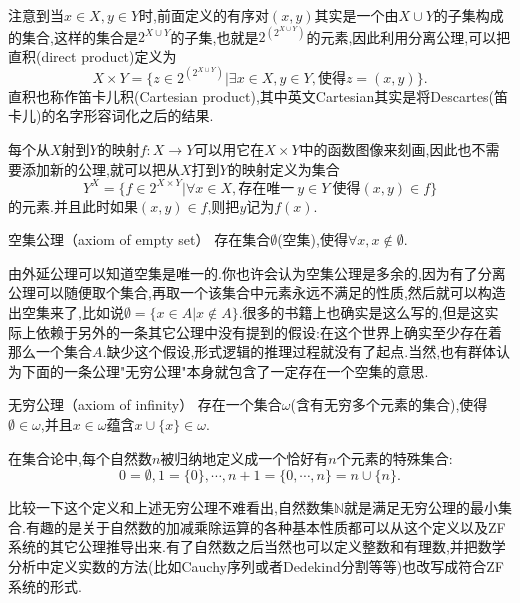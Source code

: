 \begin{frame}
注意到当$x\in X,y\in Y$时,前面定义的有序对$(x,y)$其实是一个由$X\cup Y$的子集构成的集合,这样的集合是$2^{X\cup Y}$的子集,也就是$2^{(2^{X\cup Y})}$的元素,因此利用分离公理,可以把直积(direct product)定义为
\begin{equation}
X\times Y = \{ z\in 2^{(2^{X\cup Y})}| \exists x\in X,y\in Y,\text{使得}z=(x,y) \}.
\end{equation}
直积也称作笛卡儿积(Cartesian product),其中英文Cartesian其实是将Descartes(笛卡儿)的名字形容词化之后的结果.

每个从$X$射到$Y$的映射$f:X\rightarrow Y$可以用它在$X\times Y$中的函数图像来刻画,因此也不需要添加新的公理,就可以把从$X$打到$Y$的映射定义为集合
\begin{equation}
Y^X = \{f\in 2^{X\times Y} | \forall x\in X,\text{存在唯一}\ y\in Y\ \text{使得}(x,y)\in f \}
\end{equation}
的元素.并且此时如果$(x,y)\in f$,则把$y$记为$f(x)$.
\end{frame}

\begin{frame}
\alert{空集公理}（axiom of empty set） 存在集合$\emptyset$(空集),使得$\forall x,x\notin \emptyset$.

由外延公理可以知道空集是唯一的.你也许会认为空集公理是多余的,因为有了分离公理可以随便取个集合,再取一个该集合中元素永远不满足的性质,然后就可以构造出空集来了,比如说$\emptyset=\{x\in A|x\notin A\}$.很多的书籍上也确实是这么写的,但是这实际上依赖于另外的一条其它公理中没有提到的假设:在这个世界上确实至少存在着那么一个集合$A$.缺少这个假设,形式逻辑的推理过程就没有了起点.当然,也有群体认为下面的一条公理"无穷公理"本身就包含了一定存在一个空集的意思.
\end{frame}

\begin{frame}
\alert{无穷公理}（axiom of infinity） 存在一个集合$\omega$(含有无穷多个元素的集合),使得$\emptyset\in\omega$,并且$x\in\omega$蕴含$x\cup\{x\}\in\omega$.

在集合论中,每个自然数$n$被归纳地定义成一个恰好有$n$个元素的特殊集合:
\begin{equation}
0=\emptyset,1=\{0\},\cdots,n+1=\{0,\cdots,n\} = n\cup\{n\}.
\end{equation}	

比较一下这个定义和上述无穷公理不难看出,自然数集$\mathbb{N}$就是满足无穷公理的最小集合.有趣的是关于自然数的加减乘除运算的各种基本性质都可以从这个定义以及ZF系统的其它公理推导出来.有了自然数之后当然也可以定义整数和有理数,并把数学分析中定义实数的方法(比如Cauchy序列或者Dedekind分割等等)也改写成符合ZF系统的形式.
\end{frame}

